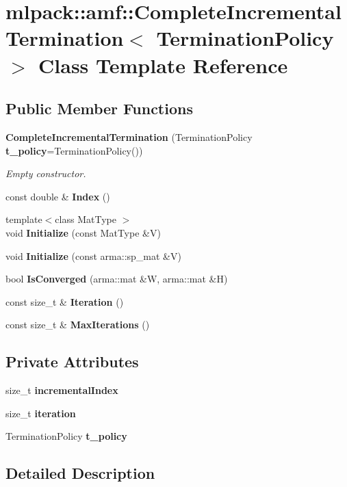\section{mlpack\-:\-:amf\-:\-:Complete\-Incremental\-Termination$<$ Termination\-Policy $>$ Class Template Reference}
\label{classmlpack_1_1amf_1_1CompleteIncrementalTermination}
\subsection*{Public Member Functions}
\begin{DoxyCompactItemize}
\item 
{\bf Complete\-Incremental\-Termination} (Termination\-Policy {\bf t\-\_\-policy}=Termination\-Policy())
\begin{DoxyCompactList}\small\item\em Empty constructor. \end{DoxyCompactList}\item 
const double \& {\bf Index} ()
\item 
{\footnotesize template$<$class Mat\-Type $>$ }\\void {\bf Initialize} (const Mat\-Type \&V)
\item 
void {\bf Initialize} (const arma\-::sp\-\_\-mat \&V)
\item 
bool {\bf Is\-Converged} (arma\-::mat \&W, arma\-::mat \&H)
\item 
const size\-\_\-t \& {\bf Iteration} ()
\item 
const size\-\_\-t \& {\bf Max\-Iterations} ()
\end{DoxyCompactItemize}
\subsection*{Private Attributes}
\begin{DoxyCompactItemize}
\item 
size\-\_\-t {\bf incremental\-Index}
\item 
size\-\_\-t {\bf iteration}
\item 
Termination\-Policy {\bf t\-\_\-policy}
\end{DoxyCompactItemize}


\subsection{Detailed Description}
